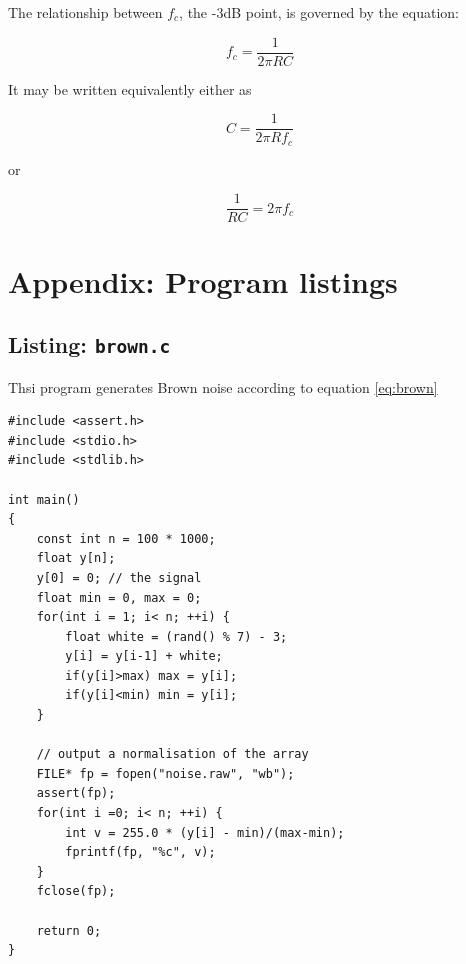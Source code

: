 \documentclass[a4paper,10pt]{article}
\def\code#1{\texttt{#1}}
\begin{document}
The relationship between $f_c$, the -3dB point, is governed by the equation:

\begin{equation}
	f_c = \frac{1}{2 \pi R C}
\end{equation}

It may be written equivalently either as

\begin{equation}
	C = \frac{1}{2 \pi R f_c}
\end{equation}

or

\begin{equation}
	\frac{1}{RC} = 2 \pi f_c
\end{equation}




\appendix

\section{Appendix: Program listings}

\label{sec:brown}
\subsection{Listing: \code{brown.c}} 

Thsi program generates Brown noise according to equation \ref{eq:brown}

\begin{Verbatim}[tabsize=8]
#include <assert.h>
#include <stdio.h>
#include <stdlib.h>

int main()
{
	const int n = 100 * 1000;
	float y[n];
	y[0] = 0; // the signal
	float min = 0, max = 0;
	for(int i = 1; i< n; ++i) {
		float white = (rand() % 7) - 3;
		y[i] = y[i-1] + white;
		if(y[i]>max) max = y[i];
		if(y[i]<min) min = y[i];
	}

	// output a normalisation of the array
	FILE* fp = fopen("noise.raw", "wb");
	assert(fp);
	for(int i =0; i< n; ++i) {
		int v = 255.0 * (y[i] - min)/(max-min);
		fprintf(fp, "%c", v);
	}
	fclose(fp);

	return 0;
}
\end{Verbatim}
\end{document}
